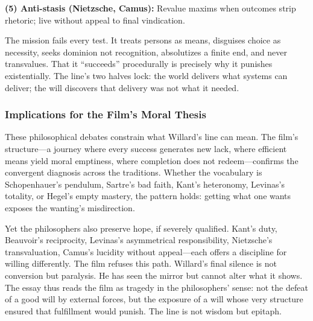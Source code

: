 \textbf{(5) Anti-stasis (Nietzsche, Camus):} Revalue maxims when outcomes strip rhetoric; live 
without appeal to final vindication.

The mission fails every test. It treats persons as means, disguises choice as necessity, seeks 
dominion not recognition, absolutizes a finite end, and never transvalues. That it 
``succeeds'' procedurally is precisely why it punishes existentially. The line's two halves 
lock: the world delivers what systems can deliver; the will discovers that delivery was not 
what it needed.

\subsubsection*{Implications for the Film's Moral Thesis}

These philosophical debates constrain what Willard's line can mean. The film's structure---a 
journey where every success generates new lack, where efficient means yield moral emptiness, 
where completion does not redeem---confirms the convergent diagnosis across the traditions. 
Whether the vocabulary is Schopenhauer's pendulum, Sartre's bad faith, Kant's heteronomy, 
Levinas's totality, or Hegel's empty mastery, the pattern holds: getting what one wants 
exposes the wanting's misdirection.

Yet the philosophers also preserve hope, if severely qualified. Kant's duty, Beauvoir's 
reciprocity, Levinas's asymmetrical responsibility, Nietzsche's transvaluation, Camus's 
lucidity without appeal---each offers a discipline for willing differently. The film refuses 
this path. Willard's final silence is not conversion but paralysis. He has seen the mirror but 
cannot alter what it shows. The essay thus reads the film as tragedy in the philosophers' 
sense: not the defeat of a good will by external forces, but the exposure of a will whose very 
structure ensured that fulfillment would punish. The line is not wisdom but epitaph.

